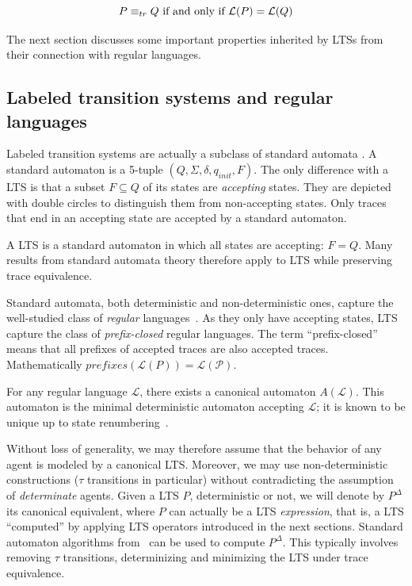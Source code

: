 \begin{equation}
P \equiv_{tr} Q$~if~and~only~if~$\mathcal{L}(P) = \mathcal{L}(Q)
\end{equation}

The next section discusses some important properties inherited by LTSs from their connection with regular languages. 

\subsection{Labeled transition systems and regular languages\label{section:background-lts-and-regular-languages}}

Labeled transition systems are actually a subclass of standard automata \cite{Hopcroft:1979}. A standard automaton is a 5-tuple $(Q,\Sigma,\delta,q_{init},F)$. The only difference with a LTS is that a subset $F \subseteq Q$ of its states are \emph{accepting} states. They are depicted with double circles to distinguish them from non-accepting states. Only traces that end in an accepting state are accepted by a standard automaton. 

A LTS is a standard automaton in which all states are accepting: $F = Q$. Many results from standard automata theory therefore apply to LTS while preserving trace equivalence.

Standard automata, both deterministic and non-deterministic ones, capture the well-studied class of \emph{regular} languages~\cite{Hopcroft:1979}. As they only have accepting states, LTS capture the class of \emph{prefix-closed} regular languages. The term ``prefix-closed'' means that all prefixes of accepted traces are also accepted traces. Mathematically $prefixes(\mathcal{L}(P)) = \mathcal{L(P)}$.

For any regular language $\mathcal{L}$, there exists a canonical automaton $A(\mathcal{L})$. This automaton is the minimal deterministic automaton accepting $\mathcal{L}$; it is known to be unique up to state renumbering~\cite{Gold:1978}. 

Without loss of generality, we may therefore assume that the behavior of any agent is modeled by a canonical LTS. Moreover, we may use non-deterministic constructions ($\tau$ transitions in particular) without contradicting the assumption of \emph{determinate} agents. Given a LTS $P$, deterministic or not, we will denote by $P^{\Delta}$ its canonical equivalent, where $P$ can actually be a LTS \emph{expression}, that is, a LTS ``computed'' by applying LTS operators introduced in the next sections. Standard automaton algorithms from~\cite{Hopcroft:1979} can be used to compute $P^\Delta$. This typically involves removing $\tau$ transitions, determinizing and minimizing the LTS under trace equivalence.

